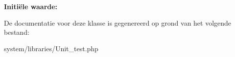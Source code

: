 {\bfseries Initi\"{e}le waarde\+:}
\begin{DoxyCode}{0}
\DoxyCodeLine{        \textcolor{stringliteral}{'test\_name'},}
\DoxyCodeLine{        \textcolor{stringliteral}{'test\_datatype'},}
\DoxyCodeLine{        \textcolor{stringliteral}{'res\_datatype'},}
\DoxyCodeLine{        \textcolor{stringliteral}{'result'},}
\DoxyCodeLine{        \textcolor{stringliteral}{'file'},}
\DoxyCodeLine{        \textcolor{stringliteral}{'line'},}
\DoxyCodeLine{        \textcolor{stringliteral}{'notes'}}
\DoxyCodeLine{    )}

\end{DoxyCode}


De documentatie voor deze klasse is gegenereerd op grond van het volgende bestand\+:\begin{DoxyCompactItemize}
\item 
system/libraries/Unit\+\_\+test.\+php\end{DoxyCompactItemize}
